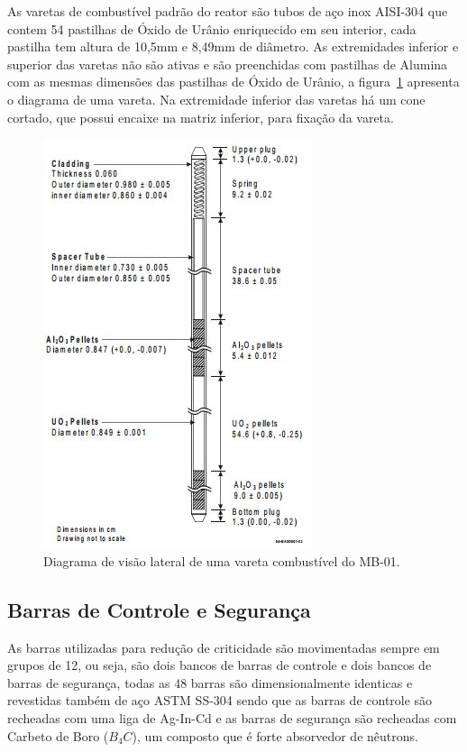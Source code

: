 \documentclass[
	12pt,				%
	openany,			%
	twoside,			%
	a4paper,			%
	english,			%
	french,				%
	spanish,			%
	brazil				%
	]{abntex2}
\begin{document}
As varetas de combustível padrão do reator são tubos de aço inox AISI-304 que contem 54 pastilhas de Óxido de Urânio enriquecido em seu interior, cada pastilha tem altura de 10,5mm e 8,49mm de diâmetro. As extremidades inferior e superior das varetas não são ativas e são preenchidas com pastilhas de Alumina com as mesmas dimensões das pastilhas de Óxido de Urânio, a figura~\ref{vareta} apresenta o diagrama de uma vareta. Na extremidade inferior das varetas há um cone cortado, que possui encaixe na matriz inferior, para fixação da vareta.
\begin{figure}[htpb]
	\caption{\label{vareta}Diagrama de visão lateral de uma vareta combustível do MB-01.}
	\begin{center}
	    \includegraphics[scale=1]{figs/VARETA_SIDE_VIEW}
	\end{center}
\end{figure}

\newpage
\subsection{Barras de Controle e Segurança}

As barras utilizadas para redução de criticidade são movimentadas
sempre em grupos de 12, ou seja, são dois bancos de barras de controle
e dois bancos de barras de segurança, todas as 48 barras são dimensionalmente
identicas e revestidas também de aço ASTM SS-304 sendo que as barras
de controle são recheadas com uma liga de Ag-In-Cd e as barras de
segurança são recheadas com Carbeto de Boro ($B_{4}C$), um composto
que é forte absorvedor de nêutrons.
\end{document}
